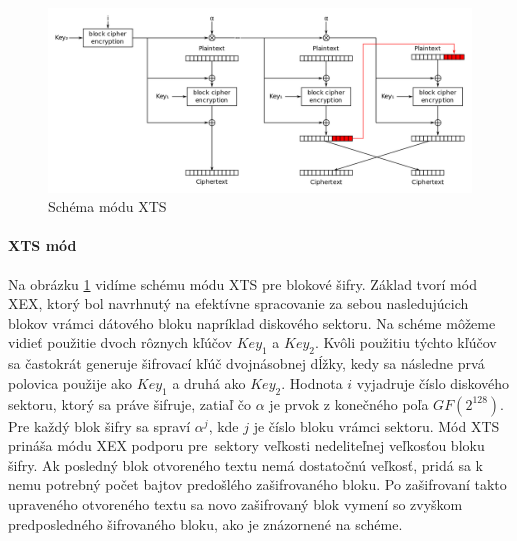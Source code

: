 \begin{figure}[h]
    \centering
    \includegraphics[width=1\textwidth]{XTS_mode_encryption}
    \caption{Schéma módu XTS}
    \label{fig:XTS}
\end{figure}

\paragraph{XTS mód}
Na obrázku \ref{fig:XTS} vidíme schému módu XTS pre blokové šifry. Základ tvorí mód XEX, ktorý bol navrhnutý na efektívne spracovanie za sebou nasledujúcich blokov vrámci dátového bloku napríklad diskového sektoru. Na schéme môžeme vidieť použitie dvoch rôznych kľúčov \(Key_1\) a \(Key_2\). Kvôli použitiu týchto kľúčov sa častokrát generuje šifrovací kľúč dvojnásobnej dĺžky, kedy sa následne prvá polovica použije ako \(Key_1\) a druhá ako \(Key_2\). Hodnota \(i\) vyjadruje číslo diskového sektoru, ktorý sa práve šifruje, zatiaľ čo \(\alpha\) je prvok z konečného poľa \(GF(2^128)\). Pre každý blok šifry sa spraví \(\alpha^j\), kde \(j\) je číslo bloku vrámci sektoru. Mód XTS prináša módu XEX podporu pre~sektory veľkosti nedeliteľnej veľkosťou bloku šifry. Ak posledný blok otvoreného textu nemá dostatočnú veľkosť, pridá sa k nemu potrebný počet bajtov predošlého zašifrovaného bloku. Po zašifrovaní takto upraveného otvoreného textu sa novo zašifrovaný blok vymení so zvyškom predposledného šifrovaného bloku, ako je znázornené na schéme.

